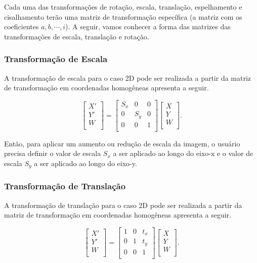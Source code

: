 \documentclass{article}
\begin{document}
\noindent
Cada uma das transformações de rotação, escala, translação, espelhamento e cisalhamento terão uma matriz de transformação específica (a matriz com os coeficientes $a,b,\cdots, i$). A seguir, vamos conhecer a forma das matrizes das transformações de escala, translação e rotação.

\subsubsection{Transformação de Escala}
A transformação de escala para o caso 2D pode ser realizada a partir da matriz de transformação em coordenadas homogêneas apresenta a seguir.

\begin{equation}
\begin{bmatrix} 
X'\\
Y'\\
W \\
\end{bmatrix}
=
\begin{bmatrix} 
S_x & 0   & 0 \\
0   & S_y & 0 \\
0   & 0   & 1 \\
\end{bmatrix}
%
\begin{bmatrix} 
X \\
Y \\
W \\
\end{bmatrix}.
\label{eq:transesc}
\end{equation}

\noindent
Então, para aplicar um aumento ou redução de escala da imagem, o usuário precisa definir o valor de escala $S_x$ a ser aplicado ao longo do eixo-x e o valor de escala $S_y$ a ser aplicado ao longo do eixo-y.
 
\subsubsection{Transformação de Translação} 
A transformação de translação para o caso 2D pode ser realizada a partir da matriz de transformação em coordenadas homogêneas apresenta a seguir.

\begin{equation}
\begin{bmatrix} 
X'\\
Y'\\
W \\
\end{bmatrix}
=
\begin{bmatrix} 
1 & 0 & t_x \\
0 & 1 & t_y \\
0 & 0 & 1 \\
\end{bmatrix}
%
\begin{bmatrix} 
X \\
Y \\
W \\
\end{bmatrix}.
\label{eq:transtra}
\end{equation}
\end{document}
